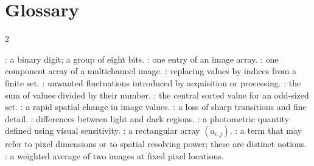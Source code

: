 \ifdefined\StandaloneChapter
\par\noindent\begin{minipage}{\linewidth}
\section*{Glossary}
\begin{multicols}{2}\small\raggedright
\begin{rs}
: a binary digit; a group of eight bits.
: one entry of an image array.
: one component array of a multichannel image.
: replacing values by indices from a finite set.
: unwanted fluctuations introduced by acquisition or processing.
: the sum of values divided by their number.
: the central sorted value for an odd-sized set.
: a rapid spatial change in image values.
: a loss of sharp transitions and fine detail.
: differences between light and dark regions.
: a photometric quantity defined using visual sensitivity.
: a rectangular array $(a_{i,j})$.
: a term that may refer to pixel dimensions or to spatial resolving power; these are distinct notions.
: a weighted average of two images at fixed pixel locations.
\end{rs}
\end{multicols}
\end{minipage}\par
\fi
